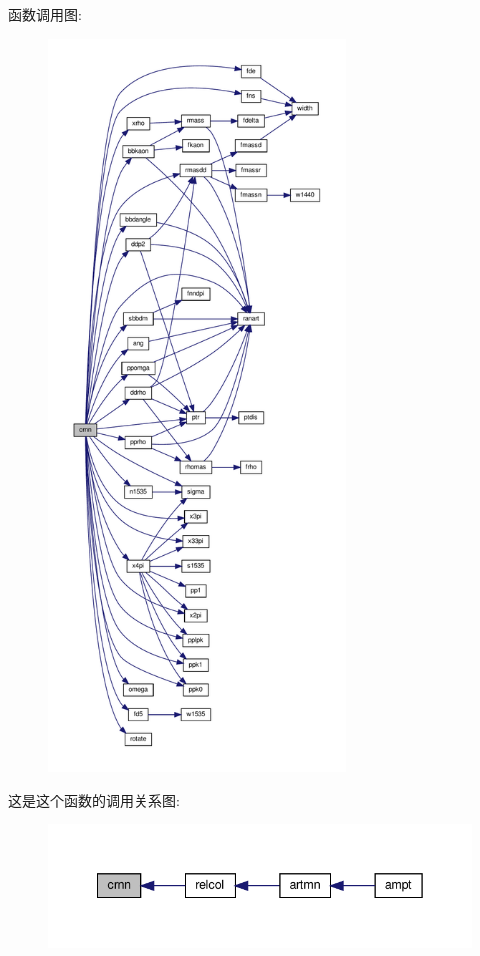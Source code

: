 函数调用图\+:
\nopagebreak
\begin{figure}[H]
\begin{center}
\leavevmode
\includegraphics[height=550pt]{crnn_8f90_aee34fcfa3e0f0b41684097aa4d952c65_cgraph}
\end{center}
\end{figure}
这是这个函数的调用关系图\+:
\nopagebreak
\begin{figure}[H]
\begin{center}
\leavevmode
\includegraphics[width=342pt]{crnn_8f90_aee34fcfa3e0f0b41684097aa4d952c65_icgraph}
\end{center}
\end{figure}
